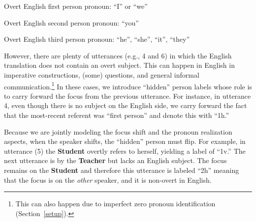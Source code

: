 \documentclass[11pt]{report}
\newcommand{\speaker}[1]{{\bf\footnotesize\textsf{#1}}}
\begin{document}
\begin{description} \itemsep1pt \parskip0pt 
\item[1v:] Overt English first person pronoun: ``I'' or ``we''
\item[2v:] Overt English second person pronoun: ``you''
\item[3v:] Overt English third person pronoun: ``he'', ``she'', ``it'', ``they'' 
\end{description}

However, there are plenty of utterances (e.g., 4 and 6) in which the English translation does not contain an overt subject. This can happen in English in imperative constructions, (some) questions, and general informal communication.\footnote{This can also happen due to imperfect zero pronoun identification (Section~\ref{setup}).}
In these cases, we introduce ``hidden'' person labels whose role is to carry forward the focus from the previous utterance. For instance, in utterance 4, even though there is no subject on the English side, we carry forward the fact that the most-recent referent was ``first person'' and denote this with ``1h.''

Because we are jointly modeling the focus shift and the pronoun realization aspects, when the speaker shifts, the ``hidden'' person must flip. For example, in utterance (5) the \speaker{Student} overtly refers to herself, yielding a label of ``1v.'' The next utterance is by the \speaker{Teacher} but lacks an English subject. The focus remains on the \speaker{Student} and therefore this utterance is labeled ``2h'' meaning that the focus is on the \emph{other} speaker, and it is non-overt in English.
\end{document}
